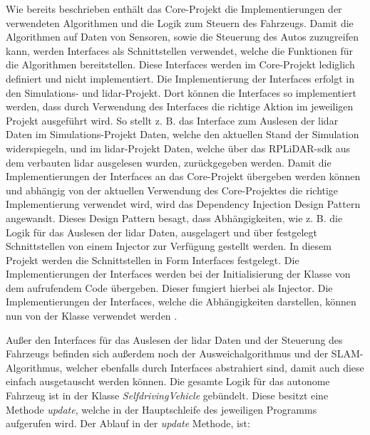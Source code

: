 Wie bereits beschrieben enthält das Core-Projekt die Implementierungen der verwendeten Algorithmen und die Logik zum Steuern des Fahrzeugs. 
Damit die Algorithmen auf Daten von Sensoren, sowie die Steuerung des Autos zuzugreifen kann, werden Interfaces als Schnittstellen verwendet, 
welche die Funktionen für die Algorithmen bereitstellen. Diese Interfaces werden im Core-Projekt lediglich definiert und nicht implementiert. 
Die Implementierung der Interfaces erfolgt in den Simulations- und \ac{lidar}-Projekt. 
Dort können die Interfaces so implementiert werden, dass durch Verwendung des Interfaces die richtige Aktion im jeweiligen Projekt ausgeführt wird. 
So stellt z. B. das Interface zum Auslesen der \ac{lidar} Daten im Simulations-Projekt Daten, welche den aktuellen Stand der Simulation widerspiegeln, 
und im \ac{lidar}-Projekt Daten, welche über das RPLiDAR-\ac{sdk} aus dem verbauten \ac{lidar} ausgelesen wurden, zurückgegeben werden.
Damit die Implementierungen der Interfaces an das Core-Projekt übergeben werden können und abhängig von der aktuellen Verwendung des Core-Projektes 
die richtige Implementierung verwendet wird, wird das Dependency Injection Design Pattern angewandt. 
Dieses Design Pattern besagt, dass Abhängigkeiten, wie z. B. die Logik für das Auslesen der \ac{lidar} Daten, 
ausgelagert und über festgelegt Schnittstellen von einem Injector zur Verfügung gestellt werden. 
In diesem Projekt werden die Schnittstellen in Form Interfaces festgelegt. 
Die Implementierungen der Interfaces werden bei der Initialisierung der Klasse von dem aufrufendem Code übergeben. 
Dieser fungiert hierbei als Injector. 
Die Implementierungen der Interfaces, welche die Abhängigkeiten darstellen, können nun von der Klasse verwendet werden \cite{dependencyInjection}.

Außer den Interfaces für das Auslesen der \ac{lidar} Daten und der Steuerung des Fahrzeugs befinden sich außerdem noch der Ausweichalgorithmus 
und der SLAM-Algorithmus, welcher ebenfalls durch Interfaces abstrahiert sind, damit auch diese einfach ausgetauscht werden können. 
Die gesamte Logik für das autonome Fahrzeug ist in der Klasse \textit{SelfdrivingVehicle} gebündelt. 
Diese besitzt eine Methode \textit{update}, welche in der Hauptschleife des jeweiligen Programms aufgerufen wird. 
Der Ablauf in der \textit{update} Methode, ist:

